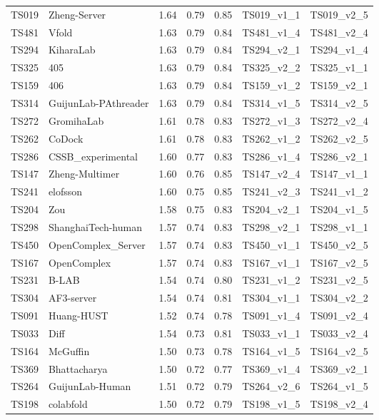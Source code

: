 \begin{longtable}{lllllll}
TS019 & Zheng-Server & 1.64 & 0.79 & 0.85 & TS019\_v1\_1 & TS019\_v2\_5 \\ 
TS481 & Vfold & 1.63 & 0.79 & 0.84 & TS481\_v1\_4 & TS481\_v2\_4 \\ 
TS294 & KiharaLab & 1.63 & 0.79 & 0.84 & TS294\_v2\_1 & TS294\_v1\_4 \\ 
TS325 & 405 & 1.63 & 0.79 & 0.84 & TS325\_v2\_2 & TS325\_v1\_1 \\ 
TS159 & 406 & 1.63 & 0.79 & 0.84 & TS159\_v1\_2 & TS159\_v2\_1 \\ 
TS314 & GuijunLab-PAthreader & 1.63 & 0.79 & 0.84 & TS314\_v1\_5 & TS314\_v2\_5 \\ 
TS272 & GromihaLab & 1.61 & 0.78 & 0.83 & TS272\_v1\_3 & TS272\_v2\_4 \\ 
TS262 & CoDock & 1.61 & 0.78 & 0.83 & TS262\_v1\_2 & TS262\_v2\_5 \\ 
TS286 & CSSB\_experimental & 1.60 & 0.77 & 0.83 & TS286\_v1\_4 & TS286\_v2\_1 \\ 
TS147 & Zheng-Multimer & 1.60 & 0.76 & 0.85 & TS147\_v2\_4 & TS147\_v1\_1 \\ 
TS241 & elofsson & 1.60 & 0.75 & 0.85 & TS241\_v2\_3 & TS241\_v1\_2 \\ 
TS204 & Zou & 1.58 & 0.75 & 0.83 & TS204\_v2\_1 & TS204\_v1\_5 \\ 
TS298 & ShanghaiTech-human & 1.57 & 0.74 & 0.83 & TS298\_v2\_1 & TS298\_v1\_1 \\ 
TS450 & OpenComplex\_Server & 1.57 & 0.74 & 0.83 & TS450\_v1\_1 & TS450\_v2\_5 \\ 
TS167 & OpenComplex & 1.57 & 0.74 & 0.83 & TS167\_v1\_1 & TS167\_v2\_5 \\ 
TS231 & B-LAB & 1.54 & 0.74 & 0.80 & TS231\_v1\_2 & TS231\_v2\_5 \\ 
TS304 & AF3-server & 1.54 & 0.74 & 0.81 & TS304\_v1\_1 & TS304\_v2\_2 \\ 
TS091 & Huang-HUST & 1.52 & 0.74 & 0.78 & TS091\_v1\_4 & TS091\_v2\_4 \\ 
TS033 & Diff & 1.54 & 0.73 & 0.81 & TS033\_v1\_1 & TS033\_v2\_4 \\ 
TS164 & McGuffin & 1.50 & 0.73 & 0.78 & TS164\_v1\_5 & TS164\_v2\_5 \\ 
TS369 & Bhattacharya & 1.50 & 0.72 & 0.77 & TS369\_v1\_4 & TS369\_v2\_1 \\ 
TS264 & GuijunLab-Human & 1.51 & 0.72 & 0.79 & TS264\_v2\_6 & TS264\_v1\_5 \\ 
TS198 & colabfold & 1.50 & 0.72 & 0.79 & TS198\_v1\_5 & TS198\_v2\_4 \\ 

\end{longtable}
